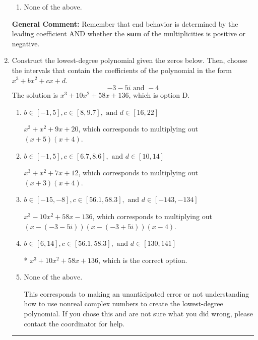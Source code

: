\documentclass{extbook}[14pt]
\newcommand{\litem}[1]{\item #1

\rule{\textwidth}{0.4pt}}
\begin{document}
\begin{enumerate}
{\begin{enumerate}[label=\Alph*.]
\item None of the above.\end{enumerate}
\textbf{General Comment:} Remember that end behavior is determined by the leading coefficient AND whether the \textbf{sum} of the multiplicities is positive or negative.
}
\litem{
Construct the lowest-degree polynomial given the zeros below. Then, choose the intervals that contain the coefficients of the polynomial in the form $x^3+bx^2+cx+d$.
\[ -3 - 5 i \text{ and } -4 \]The solution is \( x^{3} +10 x^{2} +58 x + 136 \), which is option D.\begin{enumerate}[label=\Alph*.]
\item \( b \in [-1, 5], c \in [8, 9.7], \text{ and } d \in [16, 22] \)

$x^{3} + x^{2} +9 x + 20$, which corresponds to multiplying out $(x + 5)(x + 4)$.
\item \( b \in [-1, 5], c \in [6.7, 8.6], \text{ and } d \in [10, 14] \)

$x^{3} + x^{2} +7 x + 12$, which corresponds to multiplying out $(x + 3)(x + 4)$.
\item \( b \in [-15, -8], c \in [56.1, 58.3], \text{ and } d \in [-143, -134] \)

$x^{3} -10 x^{2} +58 x -136$, which corresponds to multiplying out $(x-(-3 - 5 i))(x-(-3 + 5 i))(x -4)$.
\item \( b \in [6, 14], c \in [56.1, 58.3], \text{ and } d \in [130, 141] \)

* $x^{3} +10 x^{2} +58 x + 136$, which is the correct option.
\item \( \text{None of the above.} \)

This corresponds to making an unanticipated error or not understanding how to use nonreal complex numbers to create the lowest-degree polynomial. If you chose this and are not sure what you did wrong, please contact the coordinator for help.
\end{enumerate}

}
\end{enumerate}
\end{document}
